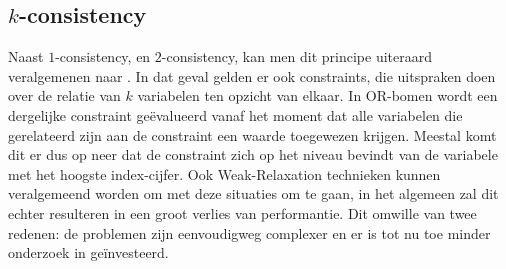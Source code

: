 \subsection{$k$-consistency}
Naast $1$-consistency, en $2$-consistency, kan men dit principe uiteraard veralgemenen naar . In dat geval gelden er ook constraints, die uitspraken doen over de relatie van $k$ variabelen ten opzicht van elkaar. In OR-bomen wordt een dergelijke constraint geëvalueerd vanaf het moment dat alle variabelen die gerelateerd zijn aan de constraint een waarde toegewezen krijgen. Meestal komt dit er dus op neer dat de constraint zich op het niveau bevindt van de variabele met het hoogste index-cijfer. Ook Weak-Relaxation technieken kunnen veralgemeend worden om met deze situaties om te gaan, in het algemeen zal dit echter resulteren in een groot verlies van performantie. Dit omwille van twee redenen: de problemen zijn eenvoudigweg complexer en er is tot nu toe minder onderzoek in geïnvesteerd.
